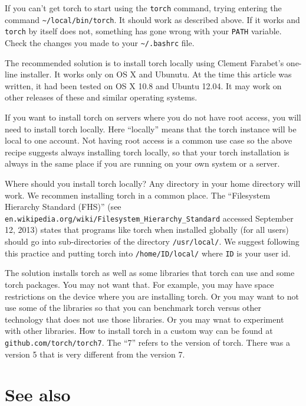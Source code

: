 \documentclass{article}
\let\code\texttt %
\begin{document}
If you can't get torch to start using the \code{torch} command, trying
entering the command \code{\textasciitilde/local/bin/torch}. It should
work as described above. If it works and \code{torch} by itself does
not, something has gone wrong with your \code{PATH} variable. Check the
changes you made to your \code{\textasciitilde/.bashrc} file.


The recommended solution is to install torch locally using Clement
Farabet's one-line installer. It works only on OS X and
Ubunutu. At the time this article was written, it had been tested on OS
X 10.8 and Ubuntu 12.04. It may work on other releases of these and
similar operating systems.

If you want to install torch on servers where you do not have root
access, you will need to install torch locally. Here ``locally'' means
that the torch instance will be local to one account. Not having root
access is a common use case so the above recipe suggests always
installing torch locally, so that your torch installation is always in
the same place if you are running on your own system or a server.

Where should you install torch locally? Any directory in your home
directory will work. We recommen installing torch in a common place. The
``Filesystem Hierarchy Standard (FHS)'' (see \\
\code{en.wikipedia.org/wiki/Filesystem\_Hierarchy\_Standard} accessed
September 12, 2013) states that programs like torch when installed
globally (for all users) should go into sub-directories of the directory
\code{/usr/local/}. We suggest following this practice and putting torch
into \code{/home/ID/local/} where \code{ID} is your user id.  

The solution installs torch as well as some libraries that torch can use
and some torch packages. You may not want that. For example, you may
have space restrictions on the device where you are installing torch. Or
you may want to not use some of the libraries so that you can benchmark
torch versus other technology that does not use those libraries. Or you
may wnat to experiment with other libraries. How to
install torch in a custom way can be found at
\code{github.com/torch/torch7}. The ``7'' refers to the version of
torch. There was a version 5 that is very different from the version 7.

\section{See also}
\end{document}
